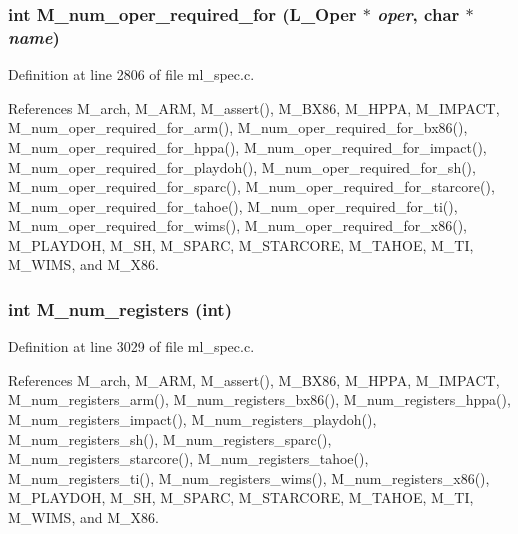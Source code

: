 \subsubsection{\setlength{\rightskip}{0pt plus 5cm}int M\_\-num\_\-oper\_\-required\_\-for (L\_\-Oper $\ast$ {\em oper}, char $\ast$ {\em name})}\label{m__spec_8h_43c42d0b62333b91280a53d4ab1df0a5}




Definition at line 2806 of file ml\_\-spec.c.

References M\_\-arch, M\_\-ARM, M\_\-assert(), M\_\-BX86, M\_\-HPPA, M\_\-IMPACT, M\_\-num\_\-oper\_\-required\_\-for\_\-arm(), M\_\-num\_\-oper\_\-required\_\-for\_\-bx86(), M\_\-num\_\-oper\_\-required\_\-for\_\-hppa(), M\_\-num\_\-oper\_\-required\_\-for\_\-impact(), M\_\-num\_\-oper\_\-required\_\-for\_\-playdoh(), M\_\-num\_\-oper\_\-required\_\-for\_\-sh(), M\_\-num\_\-oper\_\-required\_\-for\_\-sparc(), M\_\-num\_\-oper\_\-required\_\-for\_\-starcore(), M\_\-num\_\-oper\_\-required\_\-for\_\-tahoe(), M\_\-num\_\-oper\_\-required\_\-for\_\-ti(), M\_\-num\_\-oper\_\-required\_\-for\_\-wims(), M\_\-num\_\-oper\_\-required\_\-for\_\-x86(), M\_\-PLAYDOH, M\_\-SH, M\_\-SPARC, M\_\-STARCORE, M\_\-TAHOE, M\_\-TI, M\_\-WIMS, and M\_\-X86.
\subsubsection{\setlength{\rightskip}{0pt plus 5cm}int M\_\-num\_\-registers (int)}\label{m__spec_8h_97f496ce374dbb6c5cb50a04d60dbb2f}




Definition at line 3029 of file ml\_\-spec.c.

References M\_\-arch, M\_\-ARM, M\_\-assert(), M\_\-BX86, M\_\-HPPA, M\_\-IMPACT, M\_\-num\_\-registers\_\-arm(), M\_\-num\_\-registers\_\-bx86(), M\_\-num\_\-registers\_\-hppa(), M\_\-num\_\-registers\_\-impact(), M\_\-num\_\-registers\_\-playdoh(), M\_\-num\_\-registers\_\-sh(), M\_\-num\_\-registers\_\-sparc(), M\_\-num\_\-registers\_\-starcore(), M\_\-num\_\-registers\_\-tahoe(), M\_\-num\_\-registers\_\-ti(), M\_\-num\_\-registers\_\-wims(), M\_\-num\_\-registers\_\-x86(), M\_\-PLAYDOH, M\_\-SH, M\_\-SPARC, M\_\-STARCORE, M\_\-TAHOE, M\_\-TI, M\_\-WIMS, and M\_\-X86.
